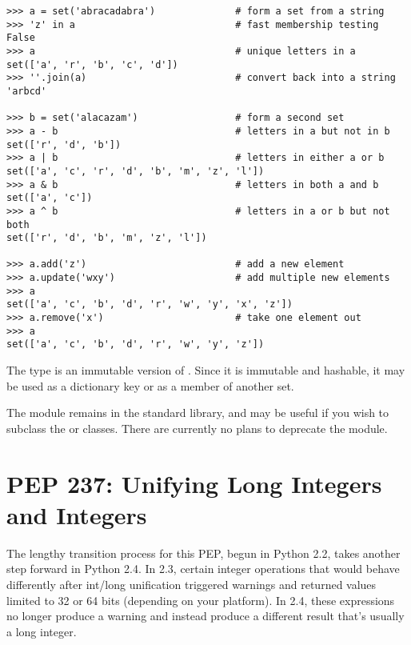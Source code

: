 \documentclass{howto}
\begin{document}
\begin{verbatim}
>>> a = set('abracadabra')              # form a set from a string
>>> 'z' in a                            # fast membership testing
False
>>> a                                   # unique letters in a
set(['a', 'r', 'b', 'c', 'd'])
>>> ''.join(a)                          # convert back into a string
'arbcd'

>>> b = set('alacazam')                 # form a second set
>>> a - b                               # letters in a but not in b
set(['r', 'd', 'b'])
>>> a | b                               # letters in either a or b
set(['a', 'c', 'r', 'd', 'b', 'm', 'z', 'l'])
>>> a & b                               # letters in both a and b
set(['a', 'c'])
>>> a ^ b                               # letters in a or b but not both
set(['r', 'd', 'b', 'm', 'z', 'l'])

>>> a.add('z')                          # add a new element
>>> a.update('wxy')                     # add multiple new elements
>>> a
set(['a', 'c', 'b', 'd', 'r', 'w', 'y', 'x', 'z'])       
>>> a.remove('x')                       # take one element out
>>> a
set(['a', 'c', 'b', 'd', 'r', 'w', 'y', 'z'])       
\end{verbatim}

The  type is an immutable version of .
Since it is immutable and hashable, it may be used as a dictionary key or
as a member of another set.  

The  module remains in the standard library, and may be
useful if you wish to subclass the  or 
classes.  There are currently no plans to deprecate the module.

\begin{seealso}
\end{seealso}


\section{PEP 237: Unifying Long Integers and Integers}

The lengthy transition process for this PEP, begun in Python 2.2,
takes another step forward in Python 2.4.  In 2.3, certain integer
operations that would behave differently after int/long unification
triggered  warnings and returned values
limited to 32 or 64 bits (depending on your platform).  In 2.4, these
expressions no longer produce a warning and instead produce a
different result that's usually a long integer.
\end{document}
